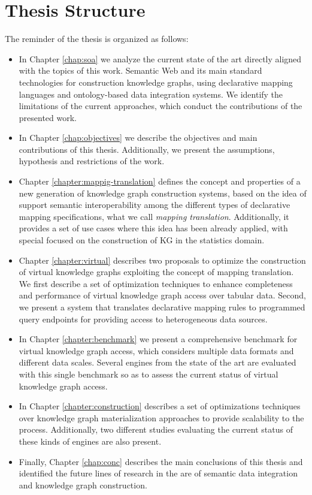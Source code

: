 






\section{Thesis Structure}
\label{sec:thesisstructure}
The reminder of the thesis is organized as follows:
\begin{itemize}
    \item In Chapter \ref{chap:soa} we analyze the current state of the art directly aligned with the topics of this work. Semantic Web and its main standard technologies for construction knowledge graphs, using declarative mapping languages and ontology-based data integration systems. We identify the limitations of the current approaches, which conduct the contributions of the presented work.
    \item In Chapter \ref{chap:objectives} we describe the objectives and main contributions of this thesis. Additionally, we present the assumptions, hypothesis and restrictions of the work.
    \item Chapter \ref{chapter:mappig-translation} defines the concept and properties of a new generation of knowledge graph construction systems, based on the idea of support semantic interoperability among the different types of declarative mapping specifications, what we call \textit{mapping translation}. Additionally, it provides a set of use cases where this idea has been already applied, with special focused on the construction of KG in the statistics domain.
    \item Chapter \ref{chapter:virtual} describes two proposals to optimize the construction of virtual knowledge graphs exploiting the concept of mapping translation. We first describe a set of optimization techniques to enhance completeness and performance of virtual knowledge graph access over tabular data. Second, we present a system that translates declarative mapping rules to programmed query endpoints for providing access to heterogeneous data sources.
    \item In Chapter \ref{chapter:benchmark} we present a comprehensive benchmark for virtual knowledge graph access, which considers multiple data formats and different data scales. Several engines from the state of the art are evaluated with this single benchmark so as to assess the current status of virtual knowledge graph access.
    \item In Chapter \ref{chapter:construction} describes a set of optimizations techniques over knowledge graph materialization approaches to provide scalability to the process. Additionally, two different studies evaluating the current status of these kinds of engines are also present.
    \item Finally, Chapter \ref{chap:conc} describes the main conclusions of this thesis and identified the future lines of research in the are of semantic data integration and knowledge graph construction.
\end{itemize}


